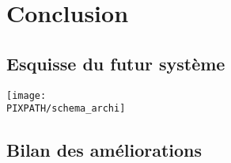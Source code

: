\section{Conclusion}

\subsection{Esquisse du futur système}

\begin{center}
\texttt{[image: \\PIXPATH/schema\_archi]}
\end{center}

\subsection{Bilan des améliorations}
